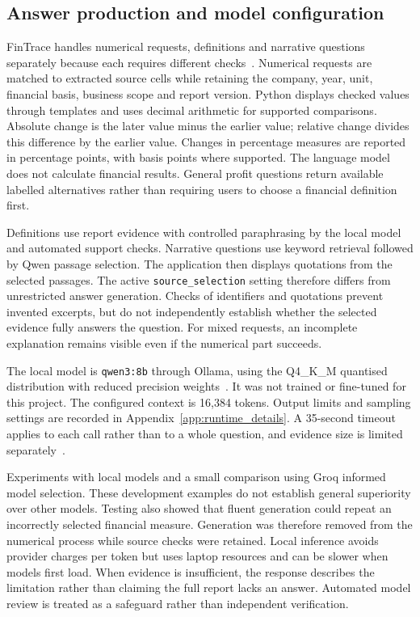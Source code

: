 \subsection{Answer production and model configuration}
\label{subsec:answer_production}

FinTrace handles numerical requests, definitions and narrative questions separately because each requires different checks~\cite{fintraceRuntime2026}. Numerical requests are matched to extracted source cells while retaining the company, year, unit, financial basis, business scope and report version. Python displays checked values through templates and uses decimal arithmetic for supported comparisons. Absolute change is the later value minus the earlier value; relative change divides this difference by the earlier value. Changes in percentage measures are reported in percentage points, with basis points where supported. The language model does not calculate financial results. General profit questions return available labelled alternatives rather than requiring users to choose a financial definition first.

Definitions use report evidence with controlled paraphrasing by the local model and automated support checks. Narrative questions use keyword retrieval followed by Qwen passage selection. The application then displays quotations from the selected passages. The active \texttt{source\_selection} setting therefore differs from unrestricted answer generation. Checks of identifiers and quotations prevent invented excerpts, but do not independently establish whether the selected evidence fully answers the question. For mixed requests, an incomplete explanation remains visible even if the numerical part succeeds.

The local model is \texttt{qwen3:8b} through Ollama, using the Q4\_K\_M quantised distribution with reduced precision weights~\cite{qwenOllama}. It was not trained or fine-tuned for this project. The configured context is 16,384 tokens. Output limits and sampling settings are recorded in Appendix~\ref{app:runtime_details}. A 35-second timeout applies to each call rather than to a whole question, and evidence size is limited separately~\cite{fintraceRuntime2026}.

Experiments with local models and a small comparison using Groq informed model selection. These development examples do not establish general superiority over other models. Testing also showed that fluent generation could repeat an incorrectly selected financial measure. Generation was therefore removed from the numerical process while source checks were retained. Local inference avoids provider charges per token but uses laptop resources and can be slower when models first load. When evidence is insufficient, the response describes the limitation rather than claiming the full report lacks an answer. Automated model review is treated as a safeguard rather than independent verification.
